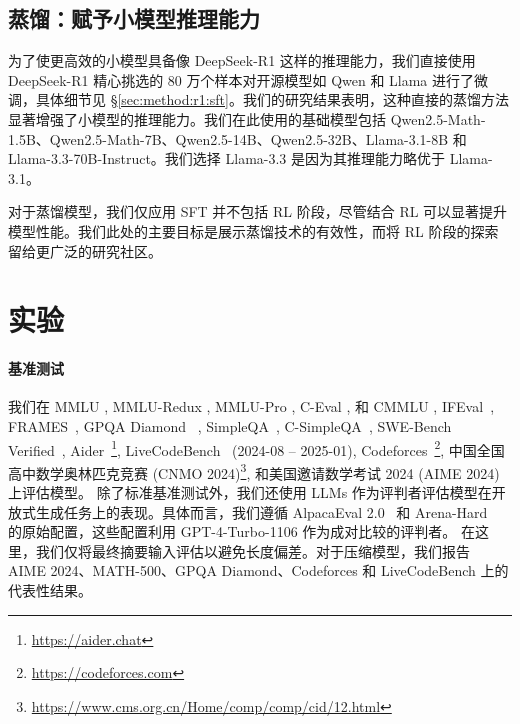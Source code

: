 \documentclass[11pt, a4paper, logo, copyright, nonumbering]{deepseek}
\begin{document}
\subsection{蒸馏：赋予小模型推理能力}

为了使更高效的小模型具备像 DeepSeek-R1 这样的推理能力，我们直接使用 DeepSeek-R1 精心挑选的 80 万个样本对开源模型如 Qwen \citep{qwen2_5} 和 Llama \citep{llama3_1_405b} 进行了微调，具体细节见 \S \ref{sec:method:r1:sft}。我们的研究结果表明，这种直接的蒸馏方法显著增强了小模型的推理能力。我们在此使用的基础模型包括 Qwen2.5-Math-1.5B、Qwen2.5-Math-7B、Qwen2.5-14B、Qwen2.5-32B、Llama-3.1-8B 和 Llama-3.3-70B-Instruct。我们选择 Llama-3.3 是因为其推理能力略优于 Llama-3.1。

对于蒸馏模型，我们仅应用 SFT 并不包括 RL 阶段，尽管结合 RL 可以显著提升模型性能。我们此处的主要目标是展示蒸馏技术的有效性，而将 RL 阶段的探索留给更广泛的研究社区。
\section{实验}

\paragraph{基准测试} 我们在 MMLU \citep{mmlu}, MMLU-Redux \citep{mmlu_redux}, MMLU-Pro \citep{mmlu_pro}, C-Eval \citep{ceval}, 和 CMMLU \citep{cmmlu}, IFEval~\citep{IFeval}, FRAMES~\citep{frames}, GPQA Diamond ~\citep{gpqa}, SimpleQA~\citep{simpleqa}, C-SimpleQA~\citep{csimpleqa}, SWE-Bench Verified~\citep{swe_verified}, Aider~\footnote{\url{https://aider.chat}}, LiveCodeBench~\citep{livecodebench} (2024-08 -- 2025-01), Codeforces~\footnote{\url{https://codeforces.com}}, 中国全国高中数学奥林匹克竞赛 (CNMO 2024)\footnote{\url{https://www.cms.org.cn/Home/comp/comp/cid/12.html}}, 和美国邀请数学考试 2024 (AIME 2024)~\citep{AIME2024} 上评估模型。 除了标准基准测试外，我们还使用 LLMs 作为评判者评估模型在开放式生成任务上的表现。具体而言，我们遵循 AlpacaEval 2.0~\citep{alpaca2.0} 和 Arena-Hard~\citep{li2024crowdsourced} 的原始配置，这些配置利用 GPT-4-Turbo-1106 作为成对比较的评判者。 在这里，我们仅将最终摘要输入评估以避免长度偏差。对于压缩模型，我们报告 AIME 2024、MATH-500、GPQA Diamond、Codeforces 和 LiveCodeBench 上的代表性结果。
\end{document}
